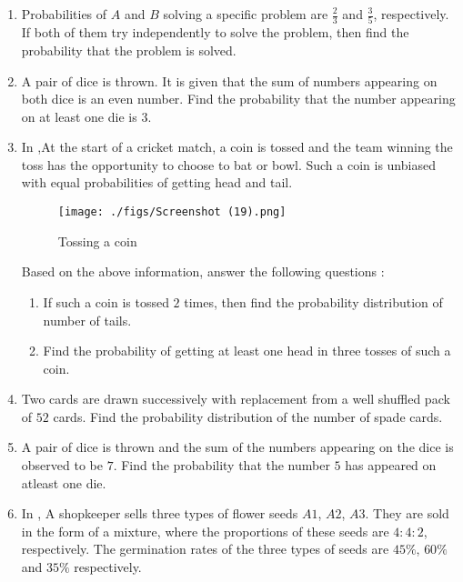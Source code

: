 \documentclass{article}
\theoremstyle{remark}
\begin{document}
\begin{enumerate}[label=\arabic*.,ref=\theenumi]
\item Probabilities of $A$ and $B$ solving a specific problem are $\frac{2}{3}$ and $\frac{3}{5}$, respectively. If both of them try independently to solve the problem, then 
find the probability that the problem is solved.

\item A pair of dice is thrown. It is given that the sum of numbers appearing on both dice is an even number. Find the probability that the number appearing on at least one die is $3$.

\item In ,At the start of a cricket match, a coin is tossed and the team winning the 
toss has the opportunity to choose to bat or bowl. Such a coin is unbiased 
with equal probabilities of getting head and tail.

\begin{figure}[H]
        \centering
        \texttt{[image: ./figs/Screenshot (19).png]}
        \caption{Tossing a coin}
        \label{fig:fig1.png}
    \end{figure}

Based on the above information, answer the following questions :
\begin{enumerate}[label=(\alph*)]
 \item  If such a coin is tossed $2$ times, then find the probability 
distribution of number of tails.
 
 \item Find the probability of getting at least one head in three tosses of 
such a coin. 
\end{enumerate}

\item Two cards are drawn successively with replacement from a well shuffled pack of $52$ cards. Find the probability distribution of the number of spade cards.

\item A pair of dice is thrown and the sum of the numbers appearing on the dice is observed to be $7$. Find the probability that the number $5$ has appeared on atleast one die.

\item In , A shopkeeper sells three types of flower seeds $A1$, $A2$, $A3$. They are sold in the form of a mixture, where the proportions of these seeds are $4:4:2$, respectively. The germination rates of the three types of seeds are $45\%$, $60\%$ and $35\%$ respectively.


\end{enumerate}
\end{document}
